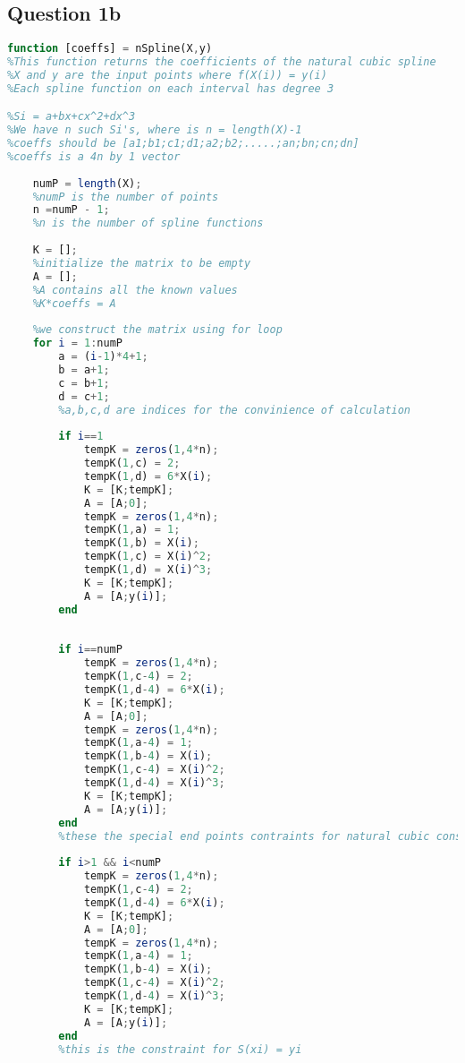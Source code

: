 \documentclass[11pt]{article} %
\begin{document}
\subsection{Question 1b}
\begin{lstlisting}[language=Octave]
function [coeffs] = nSpline(X,y)
%This function returns the coefficients of the natural cubic spline
%X and y are the input points where f(X(i)) = y(i)
%Each spline function on each interval has degree 3

%Si = a+bx+cx^2+dx^3
%We have n such Si's, where is n = length(X)-1
%coeffs should be [a1;b1;c1;d1;a2;b2;.....;an;bn;cn;dn]
%coeffs is a 4n by 1 vector
    
    numP = length(X);
    %numP is the number of points
    n =numP - 1;
    %n is the number of spline functions
    
    K = [];
    %initialize the matrix to be empty
    A = [];
    %A contains all the known values
    %K*coeffs = A
    
    %we construct the matrix using for loop
    for i = 1:numP
        a = (i-1)*4+1;
        b = a+1;
        c = b+1;
        d = c+1;
        %a,b,c,d are indices for the convinience of calculation
        
        if i==1
            tempK = zeros(1,4*n);
            tempK(1,c) = 2;
            tempK(1,d) = 6*X(i);
            K = [K;tempK];
            A = [A;0];
            tempK = zeros(1,4*n);
            tempK(1,a) = 1;
            tempK(1,b) = X(i);
            tempK(1,c) = X(i)^2;
            tempK(1,d) = X(i)^3;
            K = [K;tempK];
            A = [A;y(i)];
        end
        
        
        if i==numP
            tempK = zeros(1,4*n);
            tempK(1,c-4) = 2;
            tempK(1,d-4) = 6*X(i);
            K = [K;tempK];
            A = [A;0];
            tempK = zeros(1,4*n);
            tempK(1,a-4) = 1;
            tempK(1,b-4) = X(i);
            tempK(1,c-4) = X(i)^2;
            tempK(1,d-4) = X(i)^3;
            K = [K;tempK];
            A = [A;y(i)];
        end
        %these the special end points contraints for natural cubic constraint
        
        if i>1 && i<numP
            tempK = zeros(1,4*n);
            tempK(1,c-4) = 2;
            tempK(1,d-4) = 6*X(i);
            K = [K;tempK];
            A = [A;0];
            tempK = zeros(1,4*n);
            tempK(1,a-4) = 1;
            tempK(1,b-4) = X(i);
            tempK(1,c-4) = X(i)^2;
            tempK(1,d-4) = X(i)^3;
            K = [K;tempK];
            A = [A;y(i)];
        end
        %this is the constraint for S(xi) = yi
        

\end{lstlisting}
\end{document}
